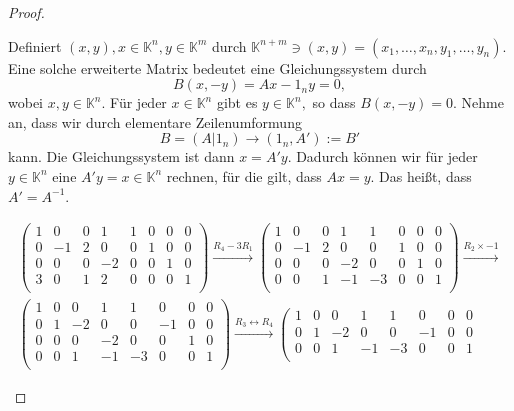 \begin{proof}
	\begin{parts}
	\item Definiert $(x,y),x\in \mathbb{K}^n,y\in\mathbb{K}^m$ durch $\mathbb{K}^{n+m}\ni(x,y)=(x_1,\dots,x_n,y_1,\dots,y_n)$. Eine solche erweiterte Matrix bedeutet eine Gleichungssystem durch
		\[
		B(x, -y)=Ax-1_ny=0
		,\]
		wobei $x,y\in \mathbb{K}^n$. F\"{u}r jeder $x\in\mathbb{K}^n$ gibt es $y\in \mathbb{K}^n,$ so dass $B(x,-y)=0$. Nehme an, dass wir durch elementare Zeilenumformung
		\[
		B=(A|1_n)\to (1_n, A'):=B'
		\]
		kann. Die Gleichungssystem ist dann $x=A'y$. Dadurch können wir f\"{u}r jeder  $y\in\mathbb{K}^n$ eine $A'y=x\in\mathbb{K}^n$ rechnen, f\"{u}r die gilt, dass $Ax=y$. Das heißt, dass $A'=A^{-1}$. 
	\item
		{\allowdisplaybreaks
		\begin{gather*}
			\left(
\begin{array}{cccc|cccc}
 1 & 0 & 0 & 1 & 1 & 0 & 0 & 0 \\
 0 & -1 & 2 & 0 & 0 & 1 & 0 & 0 \\
 0 & 0 & 0 & -2 & 0 & 0 & 1 & 0 \\
 3 & 0 & 1 & 2 & 0 & 0 & 0 & 1 \\
\end{array}
\right) \xrightarrow{R_4-3R_1} \left(
\begin{array}{cccc|cccc}
 1 & 0 & 0 & 1 & 1 & 0 & 0 & 0 \\
 0 & -1 & 2 & 0 & 0 & 1 & 0 & 0 \\
 0 & 0 & 0 & -2 & 0 & 0 & 1 & 0 \\
 0 & 0 & 1 & -1 & -3 & 0 & 0 & 1 \\
\end{array}
\right) \xrightarrow{R_2\times -1}\\ \left(
\begin{array}{cccc|cccc}
 1 & 0 & 0 & 1 & 1 & 0 & 0 & 0 \\
 0 & 1 & -2 & 0 & 0 & -1 & 0 & 0 \\
 0 & 0 & 0 & -2 & 0 & 0 & 1 & 0 \\
 0 & 0 & 1 & -1 & -3 & 0 & 0 & 1 \\
\end{array}
\right) \xrightarrow{R_3\leftrightarrow R_4} \left(
\begin{array}{cccc|cccc}
 1 & 0 & 0 & 1 & 1 & 0 & 0 & 0 \\
 0 & 1 & -2 & 0 & 0 & -1 & 0 & 0 \\
 0 & 0 & 1 & -1 & -3 & 0 & 0 & 1 \\

\end{array}
\end{gather*}}
\end{parts}
\end{proof}
